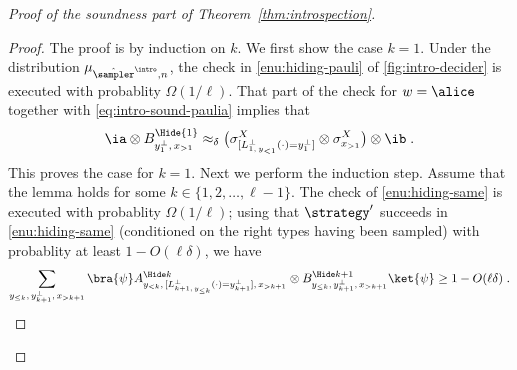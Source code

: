 \begin{proof}[Proof of the soundness part of Theorem~\ref{thm:introspection}]
  \begin{proof}
    The proof is by induction on $k$. We first show the case $k=1$.
    Under the distribution $\mu_{\tsint,n}$, the check in
    \cref{enu:hiding-pauli} of \cref{fig:intro-decider} is executed with
    probablity $\Omega(1/\ell)$. That part of the check for $w=\alice$ together
    with \cref{eq:intro-sound-paulia} implies that
    \begin{equation}
      \label{eq:base-case-hide}
      \ia \otimes B^{\Hide{1}}_{y_1^\perp,\, x_{>1}} \approx_\delta \bigl(
      \xLperpk[1] \otimes \x[x_{>1}] \bigr) \otimes \ib\;.
    \end{equation}
    This proves the case for $k=1$.
    Next we perform the induction step.
    Assume that the lemma holds for some $k \in \{1, 2, \ldots, \ell-1\}$.
    The check of \cref{enu:hiding-same} is executed with probablity
    $\Omega(1/\ell)$; using that $\strategy'$ succeeds in \cref{enu:hiding-same}
    (conditioned on the right types having been sampled) with probablity at least $1 - O(\ell
    \delta)$, we have
    \begin{equation*}
      \sum_{y_{\le k},\, y^\perp_{k+1},\, x_{>k+1}}
      \bra{\psi} \ahk[{y_{<k},\, [L^\perp_{k+1,\, y_{\le k}}
      (\cdot ) = y^\perp_{k+1}],\, x_{>k+1}}] \otimes \bhp[y_{\le k},\,
      y^\perp_{k+1},\, x_{>k+1}] \ket{\psi} \ge 1 - O(\ell \delta)\;.
    \end{equation*}


\end{proof}
\end{proof}

